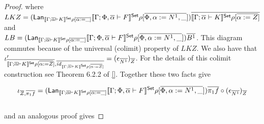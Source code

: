 \documentclass[acmsmall,review,anonymous]{acmart}
\theoremstyle{definition}
\renewcommand{\id}{\mathit{id}}
\begin{document}
\begin{proof}
  where $LKZ = (\mathsf{Lan}_{\llbracket{\Gamma; \overline{\alpha} \vdash K}\rrbracket^{\mathsf{Set}}\rho{[\overline{\alpha := \_}]}}
    \llbracket{\Gamma; \Phi, \overline{\alpha} \vdash F}\rrbracket^{\mathsf{Set}}
    \rho{[\overline{\Phi, \alpha := N^1, \_}]}) \overline{\llbracket{\Gamma; \overline{\alpha} \vdash K}\rrbracket^{\mathsf{Set}}\rho[\overline{\alpha := Z}]}$
  and \\ 
  $LB = 
    (\mathsf{Lan}_{\llbracket{\Gamma; \overline{\alpha} \vdash K}\rrbracket^{\mathsf{Set}}\rho{[\overline{\alpha := \_}]}}
      \llbracket{\Gamma; \Phi, \overline{\alpha} \vdash F}\rrbracket^{\mathsf{Set}}
      \rho{[\overline{\Phi, \alpha := N^1, \_}]}) \overline{B^1}$. 
  This diagram commutes because of the universal (colimit) property of $LKZ$. 
  We also have that 
  $\iota'_{\ol{\setsem{\Gamma; \ol\alpha \vdash K}\rho[\ol{\alpha := Z}]}, 
                \ol{\id_{\setsem{\Gamma; \ol\alpha \vdash K}\rho[\ol{\alpha := Z}]}}}
   = (\epsilon_{\ol{N^1}})_{\ol{Z}}$.
  For the details of this colimit construction see Theorem 6.2.2 of \ref{}. 
  Together these two facts give 

  $$
  \iota_{\overline{Z}, \overline{\pi_1 f}}
  = (\mathsf{Lan}_{\llbracket{\Gamma; \overline{\alpha} \vdash K}\rrbracket^{\mathsf{Set}}\rho{[\overline{\alpha := \_}]}}
                  \llbracket{\Gamma; \Phi, \overline{\alpha} \vdash F}\rrbracket^{\mathsf{Set}}
                    \rho{[\overline{\Phi, \alpha := N^1, \_}]}) \overline{\pi_1 f}
  \circ (\epsilon_{\overline{N^1}})_{\overline{Z}}
  $$ \\
  and an analogous proof gives 


\end{proof}
\end{document}
